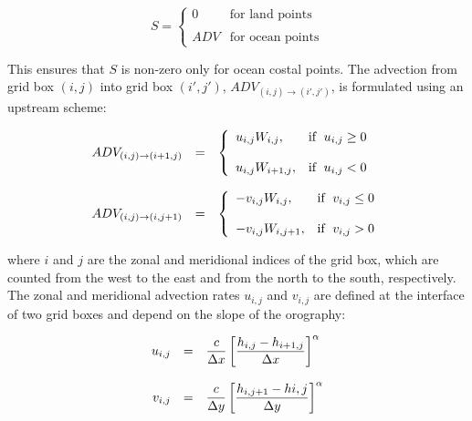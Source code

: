 \begin{equation}
S=\left\{ \begin{array}{ll} 0 & \mbox{for land points}
\\
&\\
ADV & \mbox{for ocean points} \end{array}
\right.
\end{equation}

This ensures that $S$ is non-zero only for ocean costal
points. The advection from grid box
$(i,j)$ into grid box $(i',j')$, $ADV_{(i,j)\rightarrow
(i',j')}$, is formulated using an upstream
scheme:

\begin{equation}
\begin{array}{rcl}
\displaystyle ADV_{(i,j)\rightarrow (i+1,j)} & = & \displaystyle \left\{
\begin{array}{ll} u_{i,j} W_{i,j}, & \mbox{if } \;
u_{i,j} \ge 0 \\
                             & \\
                             u_{i,j} W_{i+1,j}, & \mbox{if } \;
u_{i,j} < 0 \end{array} \right. \\
&& \\
\displaystyle ADV_{(i,j)\rightarrow (i,j+1)} & = & \displaystyle \left\{
\begin{array}{ll} -v_{i,j} W_{i,j}, & \mbox{if } \;
v_{i,j} \le 0 \\
                             & \\
                             -v_{i,j} W_{i,j+1}, & \mbox{if } \;
v_{i,j} > 0 \end{array} \right. \\
\end{array}
\end{equation}

where $i$ and $j$ are the zonal and meridional indices
of the grid box, which are counted
from the west to the east and from the north to the
south, respectively. The zonal and
meridional advection rates $u_{i,j}$ and $v_{i,j}$ are
defined at the interface of two grid
boxes and depend on the slope of the orography:

\begin{equation}
\begin{array}{rcl}
\displaystyle u_{i,j} & = & \displaystyle \frac{c}{\Delta
x}\left[\frac{h_{i,j}-h_{i+1,j}}{\Delta
x}\right]^{\alpha} \\
&& \\
\displaystyle v_{i,j} & = & \displaystyle \frac{c}{\Delta
y}\left[\frac{h_{i,j+1}-h{i,j}}{\Delta
y}\right]^{\alpha}
\end{array}
\end{equation}

